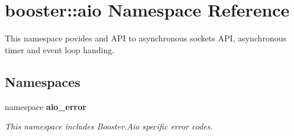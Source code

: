 \section{booster\-:\-:aio \-Namespace \-Reference}
\label{namespacebooster_1_1aio}


\-This namespace povides and \-A\-P\-I to asynchronous sockets \-A\-P\-I, asynchronous timer and event loop handing.  


\subsection*{\-Namespaces}
\begin{DoxyCompactItemize}
\item 
namespace {\bf aio\-\_\-error}
\begin{DoxyCompactList}\small\item\em \-This namespace includes \-Booster.\-Aio specific error codes. \end{DoxyCompactList}\end{DoxyCompactItemize}
